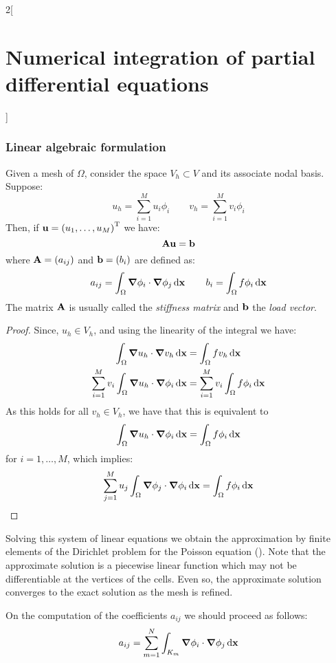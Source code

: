 \documentclass[../../../main_math.tex]{subfiles}
\begin{document}
\begin{multicols}{2}[\section{Numerical integration of partial differential equations}]
  \subsubsection{Linear algebraic formulation}
  \begin{proposition}
    Given a mesh of $\Omega$, consider the space $V_h\subset V$ and its associate nodal basis. Suppose:
    $$
      u_h=\sum_{i=1}^M u_i\phi_i\qquad v_h=\sum_{i=1}^M v_i\phi_i
    $$
    Then, if $\boldsymbol{\mathrm{u}}={(u_1,\ldots,u_M)}^{\mathrm{T}}$ we have:
    $$\boldsymbol{\mathrm{Au}}=\boldsymbol{\mathrm{b}}$$
    where $\boldsymbol{\mathrm{A}}=(a_{ij})$ and $\boldsymbol{\mathrm{b}}=(b_i)$ are defined as:
    \begin{equation*}
      a_{ij} =\int_\Omega \grad{\phi_i}\cdot\grad{\phi_j}\dd{\boldsymbol{\mathrm{x}}} \qquad b_i    =\int_\Omega f\phi_i\dd{\boldsymbol{\mathrm{x}}}
    \end{equation*}
    The matrix $\boldsymbol{\mathrm{A}}$ is usually called the \emph{stiffness matrix} and $\boldsymbol{\mathrm{b}}$ the \emph{load vector}.
  \end{proposition}
  \begin{proof}
    Since, $u_h\in V_h$, and using the linearity of the integral we have:
    \begin{align*}
      \int_\Omega \grad{u_h}\cdot\grad{v_h}\dd{\boldsymbol{\mathrm{x}}}                     & =\int_\Omega f v_h\dd{\boldsymbol{\mathrm{x}}}                    \\
      \sum_{i=1}^M v_i \int_\Omega \grad{u_h}\cdot\grad{\phi_i}\dd{\boldsymbol{\mathrm{x}}} & =\sum_{i=1}^M v_i \int_\Omega f\phi_i\dd{\boldsymbol{\mathrm{x}}}
    \end{align*}
    As this holds for all $v_h\in V_h$, we have that this is equivalent to
    $$\int_\Omega \grad{u_h}\cdot\grad{\phi_i}\dd{\boldsymbol{\mathrm{x}}} =\int_\Omega f\phi_i\dd{\boldsymbol{\mathrm{x}}}$$
    for $i=1,\ldots,M$, which implies:
    $$\sum_{j=1}^M u_j \int_\Omega \grad{\phi_j}\cdot\grad{\phi_i}\dd{\boldsymbol{\mathrm{x}}} =\int_\Omega f\phi_i\dd{\boldsymbol{\mathrm{x}}}$$
  \end{proof}
  \begin{remark}
    Solving this system of linear equations we obtain the approximation by finite elements of the Dirichlet problem for the Poisson equation (). Note that the approximate solution is a piecewise linear function which may not be differentiable at the vertices of the cells. Even so, the approximate solution converges to the exact solution as the mesh is refined.
  \end{remark}
  \begin{remark}
    On the computation of the coefficients $a_{ij}$ we should proceed as follows:
    $$
      a_{ij}=\sum_{m=1}^N\int_{K_m} \grad{\phi_i}\cdot\grad{\phi_j}\dd{\boldsymbol{\mathrm{x}}}
$$
\end{remark}
\end{multicols}
\end{document}
